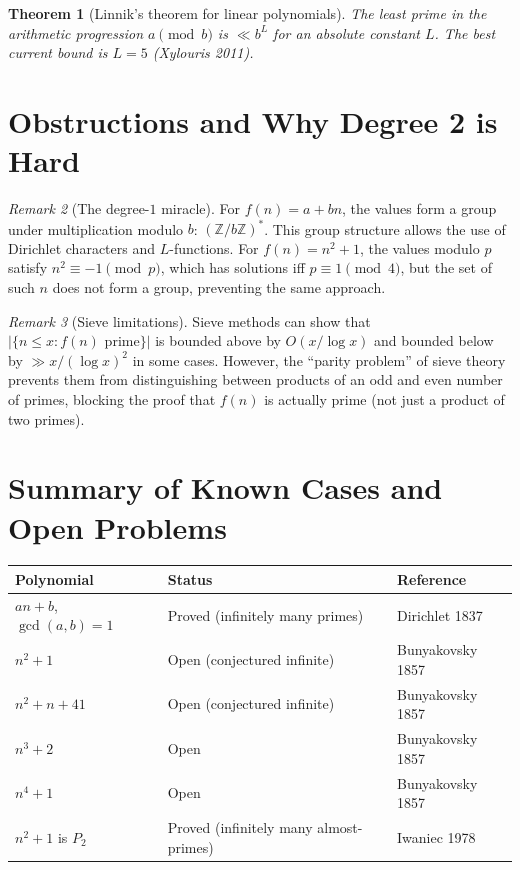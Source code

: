 \documentclass[12pt,a4paper]{amsart}
\newtheorem{theorem}{Theorem}[section]
\theoremstyle{definition}
\theoremstyle{remark}
\newtheorem{remark}[theorem]{Remark}
\newcommand{\Z}{\mathbb{Z}}
\begin{document}
\begin{theorem}[Linnik's theorem for linear polynomials]
The least prime in the arithmetic progression $a \pmod b$ is
$\ll b^L$ for an absolute constant $L$.
The best current bound is $L = 5$ (Xylouris 2011).
\end{theorem}

\section{Obstructions and Why Degree 2 is Hard}

\begin{remark}[The degree-$1$ miracle]
For $f(n) = a + bn$, the values form a group under multiplication modulo $b$:
$(\Z/b\Z)^*$.
This group structure allows the use of Dirichlet characters and $L$-functions.
For $f(n) = n^2 + 1$, the values modulo $p$ satisfy $n^2 \equiv -1 \pmod p$,
which has solutions iff $p \equiv 1 \pmod 4$, but the set of such $n$ does not
form a group, preventing the same approach.
\end{remark}

\begin{remark}[Sieve limitations]
Sieve methods can show that $|\{n \leq x : f(n) \text{ prime}\}|$ is bounded above
by $O(x/\log x)$ and bounded below by $\gg x/(\log x)^2$ in some cases.
However, the ``parity problem'' of sieve theory prevents them from distinguishing
between products of an odd and even number of primes, blocking the proof that
$f(n)$ is actually prime (not just a product of two primes).
\end{remark}

\section{Summary of Known Cases and Open Problems}

\begin{center}
\begin{tabular}{lll}
\toprule
Polynomial & Status & Reference \\
\midrule
$an + b$, $\gcd(a,b)=1$ & Proved (infinitely many primes) & Dirichlet 1837 \\
$n^2 + 1$ & Open (conjectured infinite) & Bunyakovsky 1857 \\
$n^2 + n + 41$ & Open (conjectured infinite) & Bunyakovsky 1857 \\
$n^3 + 2$ & Open & Bunyakovsky 1857 \\
$n^4 + 1$ & Open & Bunyakovsky 1857 \\
$n^2 + 1$ is $P_2$ & Proved (infinitely many almost-primes) & Iwaniec 1978 \\
\bottomrule
\end{tabular}
\end{center}
\end{document}
